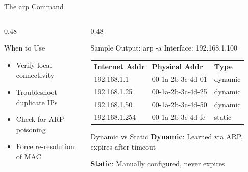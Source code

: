 \documentclass[aspectratio=169]{beamer}  %
\begin{document}
\begin{frame}{The arp Command}
\begin{columns}[T]
\begin{column}{0.48\textwidth}
            \vspace{0.2em}
            \begin{alertblock}{When to Use}
                \small
                \begin{itemize}
                    \item Verify local connectivity
                    \item Troubleshoot duplicate IPs
                    \item Check for ARP poisoning
                    \item Force re-resolution of MAC
                \end{itemize}
            \end{alertblock}
        \end{column}
        \begin{column}{0.48\textwidth}
            \begin{block}{Sample Output: arp -a}
                \ttfamily\tiny
                Interface: 192.168.1.100 \\
                \vspace{0.2em}
                \begin{tabular}{@{}l l l@{}}
                    \textbf{Internet Addr} & \textbf{Physical Addr} & \textbf{Type} \\
                    192.168.1.1 & 00-1a-2b-3c-4d-01 & dynamic \\
                    192.168.1.25 & 00-1a-2b-3c-4d-25 & dynamic \\
                    192.168.1.50 & 00-1a-2b-3c-4d-50 & dynamic \\
                    192.168.1.254 & 00-1a-2b-3c-4d-fe & static \\
                \end{tabular}
            \end{block}
            
            \vspace{0.3em}
            \begin{exampleblock}{Dynamic vs Static}
                \small
                \textbf{Dynamic}: Learned via ARP, expires after timeout
                
                \vspace{0.2em}
                \textbf{Static}: Manually configured, never expires
            \end{exampleblock}
        \end{column}
    \end{columns}
\end{frame}
\end{document}
